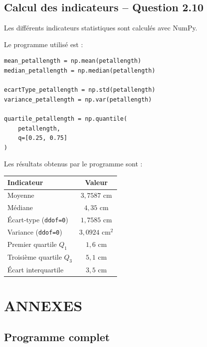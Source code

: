 \documentclass[12pt,a4paper]{article}
\begin{document}
\subsection{Calcul des indicateurs -- Question 2.10}

Les différents indicateurs statistiques sont calculés avec NumPy.

Le programme utilisé est :

\begin{lstlisting}
mean_petallength = np.mean(petallength)
median_petallength = np.median(petallength)

ecartType_petallength = np.std(petallength)
variance_petallength = np.var(petallength)

quartile_petallength = np.quantile(
    petallength,
    q=[0.25, 0.75]
)
\end{lstlisting}

Les résultats obtenus par le programme sont :

\begin{center}

\begin{tabular}{lc}
\toprule
\textbf{Indicateur} & \textbf{Valeur} \\
\midrule

Moyenne
& \(3,7587\) cm \\

Médiane
& \(4,35\) cm \\

Écart-type (\texttt{ddof=0})
& \(1,7585\) cm \\

Variance (\texttt{ddof=0})
& \(3,0924\) cm$^2$ \\

Premier quartile \(Q_1\)
& \(1,6\) cm \\

Troisième quartile \(Q_3\)
& \(5,1\) cm \\

Écart interquartile
& \(3,5\) cm \\

\bottomrule
\end{tabular}

\end{center}

\section{ANNEXES}
\subsection{Programme complet}
\end{document}
